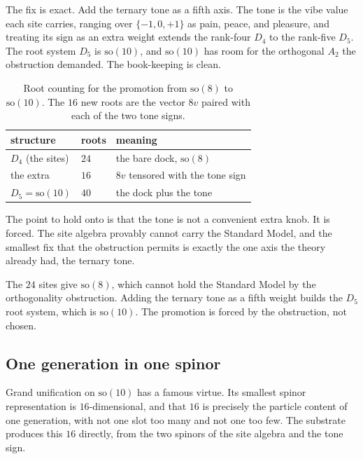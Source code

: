 The fix is exact. Add the ternary tone as a fifth axis. The tone is the vibe value each site carries, ranging over $\{-1, 0, +1\}$ as pain, peace, and pleasure, and treating its sign as an extra weight extends the rank-four $D_4$ to the rank-five $D_5$. The root system $D_5$ is $\mathrm{so}(10)$, and $\mathrm{so}(10)$ has room for the orthogonal $A_2$ the obstruction demanded. The book-keeping is clean.

\begin{table}[ht]
\centering
\begin{tabular}{@{}lll@{}}
\toprule
structure & roots & meaning \\
\midrule
$D_4$ (the sites) & $24$ & the bare dock, $\mathrm{so}(8)$ \\
the extra & $16$ & $8v$ tensored with the tone sign \\
$D_5 = \mathrm{so}(10)$ & $40$ & the dock plus the tone \\
\bottomrule
\end{tabular}
\caption{Root counting for the promotion from $\mathrm{so}(8)$ to $\mathrm{so}(10)$. The $16$ new roots are the vector $8v$ paired with each of the two tone signs.}
\label{tab:so10-roots}
\end{table}

The point to hold onto is that the tone is not a convenient extra knob. It is forced. The site algebra provably cannot carry the Standard Model, and the smallest fix that the obstruction permits is exactly the one axis the theory already had, the ternary tone.

\begin{result}
The $24$ sites give $\mathrm{so}(8)$, which cannot hold the Standard Model by the orthogonality obstruction. Adding the ternary tone as a fifth weight builds the $D_5$ root system, which is $\mathrm{so}(10)$. The promotion is forced by the obstruction, not chosen.
\end{result}

\subsection{One generation in one spinor}

Grand unification on $\mathrm{so}(10)$ has a famous virtue. Its smallest spinor representation is $16$-dimensional, and that $16$ is precisely the particle content of one generation, with not one slot too many and not one too few. The substrate produces this $16$ directly, from the two spinors of the site algebra and the tone sign.

